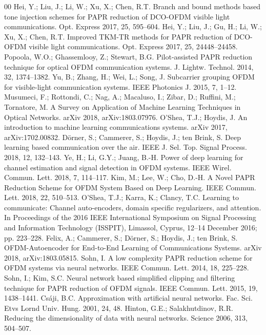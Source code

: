 \documentclass[conference]{IEEEtran}
\begin{document}
\begin{thebibliography}{00}
 Hei, Y.; Liu, J.; Li, W.; Xu, X.; Chen, R.T. Branch and bound methods based tone injection schemes for PAPR reduction of DCO-OFDM visible light communications. Opt. Express 2017, 25, 595--604.
 Hei, Y.; Liu, J.; Gu, H.; Li, W.; Xu, X.; Chen, R.T. Improved TKM-TR methods for PAPR reduction of DCO-OFDM visible light communications. Opt. Express 2017, 25, 24448--24458.
 Popoola, W.O.; Ghassemlooy, Z.; Stewart, B.G. Pilot-assisted PAPR reduction technique for optical OFDM communication systems. J. Lightw. Technol. 2014, 32, 1374--1382.
 Yu, B.; Zhang, H.; Wei, L.; Song, J. Subcarrier grouping OFDM for visible-light communication systems. IEEE Photonics J. 2015, 7, 1--12.
 Musumeci, F.; Rottondi, C.; Nag, A.; Macaluso, I.; Zibar, D.; Ruffini, M.; Tornatore, M. A Survey on Application of Machine Learning Techniques in Optical Networks. arXiv 2018, arXiv:1803.07976.
 O'Shea, T.J.; Hoydis, J. An introduction to machine learning communications systems. arXiv 2017, arXiv:1702.00832.
 Dörner, S.; Cammerer, S.; Hoydis, J.; ten Brink, S. Deep learning based communication over the air. IEEE J. Sel. Top. Signal Process. 2018, 12, 132--143.
 Ye, H.; Li, G.Y.; Juang, B.-H. Power of deep learning for channel estimation and signal detection in OFDM systems. IEEE Wirel. Commun. Lett. 2018, 7, 114--117.
 Kim, M.; Lee, W.; Cho, D.-H. A Novel PAPR Reduction Scheme for OFDM System Based on Deep Learning. IEEE Commun. Lett. 2018, 22, 510--513.
 O'Shea, T.J.; Karra, K.; Clancy, T.C. Learning to communicate: Channel auto-encoders, domain specific regularizers, and attention. In Proceedings of the 2016 IEEE International Symposium on Signal Processing and Information Technology (ISSPIT), Limassol, Cyprus, 12--14 December 2016; pp. 223--228.
 Felix, A.; Cammerer, S.; Dörner, S.; Hoydis, J.; ten Brink, S. OFDM-Autoencoder for End-to-End Learning of Communications Systems. arXiv 2018, arXiv:1803.05815.
 Sohn, I. A low complexity PAPR reduction scheme for OFDM systems via neural networks. IEEE Commun. Lett. 2014, 18, 225--228.
 Sohn, I.; Kim, S.C. Neural network based simplified clipping and filtering technique for PAPR reduction of OFDM signals. IEEE Commun. Lett. 2015, 19, 1438--1441.
 Csáji, B.C. Approximation with artificial neural networks. Fac. Sci. Etvs Lornd Univ. Hung. 2001, 24, 48.
 Hinton, G.E.; Salakhutdinov, R.R. Reducing the dimensionality of data with neural networks. Science 2006, 313, 504--507.

\end{thebibliography}
\end{document}

